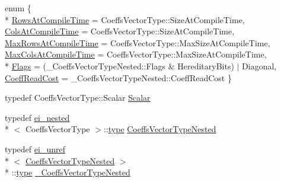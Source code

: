 \begin{DoxyCompactItemize}
\item 
enum \{ \\*
\hyperlink{structei__traits_3_01_diagonal_matrix_3_01_coeffs_vector_type_01_4_01_4_ae9f174ace295beaf78188609837c636ca0978708602c3eeff1333f0ad6fb48370}{Rows\-At\-Compile\-Time} = Coeffs\-Vector\-Type\-:\-:Size\-At\-Compile\-Time, 
\hyperlink{structei__traits_3_01_diagonal_matrix_3_01_coeffs_vector_type_01_4_01_4_ae9f174ace295beaf78188609837c636ca069f0a567bbcadd88436b4a7f5147bc5}{Cols\-At\-Compile\-Time} = Coeffs\-Vector\-Type\-:\-:Size\-At\-Compile\-Time, 
\hyperlink{structei__traits_3_01_diagonal_matrix_3_01_coeffs_vector_type_01_4_01_4_ae9f174ace295beaf78188609837c636ca82233dc1e058c2e8cc66d1f0f3b74b7d}{Max\-Rows\-At\-Compile\-Time} = Coeffs\-Vector\-Type\-:\-:Max\-Size\-At\-Compile\-Time, 
\hyperlink{structei__traits_3_01_diagonal_matrix_3_01_coeffs_vector_type_01_4_01_4_ae9f174ace295beaf78188609837c636cac234007642a00915fd1672309a89765d}{Max\-Cols\-At\-Compile\-Time} = Coeffs\-Vector\-Type\-:\-:Max\-Size\-At\-Compile\-Time, 
\\*
\hyperlink{structei__traits_3_01_diagonal_matrix_3_01_coeffs_vector_type_01_4_01_4_ae9f174ace295beaf78188609837c636cac8d947e6f38ba31ab15a729b8d6ec726}{Flags} = (\-\_\-\-Coeffs\-Vector\-Type\-Nested\-:\-:Flags \& Hereditary\-Bits) $|$ Diagonal, 
\hyperlink{structei__traits_3_01_diagonal_matrix_3_01_coeffs_vector_type_01_4_01_4_ae9f174ace295beaf78188609837c636ca63695fc7c14a8f3360f0189a5b3570bc}{Coeff\-Read\-Cost} = \-\_\-\-Coeffs\-Vector\-Type\-Nested\-:\-:Coeff\-Read\-Cost
 \}
\item 
typedef Coeffs\-Vector\-Type\-::\-Scalar \hyperlink{structei__traits_3_01_diagonal_matrix_3_01_coeffs_vector_type_01_4_01_4_af4a1ab63e1b5020ce4782f748788739b}{Scalar}
\item 
typedef \hyperlink{structei__nested}{ei\-\_\-nested}\\*
$<$ Coeffs\-Vector\-Type $>$\-::\hyperlink{glext_8h_a7d05960f4f1c1b11f3177dc963a45d86}{type} \hyperlink{structei__traits_3_01_diagonal_matrix_3_01_coeffs_vector_type_01_4_01_4_a60ad4adeaeebca8e580ddeadd36b8256}{Coeffs\-Vector\-Type\-Nested}
\item 
typedef \hyperlink{structei__unref}{ei\-\_\-unref}\\*
$<$ \hyperlink{structei__traits_3_01_diagonal_matrix_3_01_coeffs_vector_type_01_4_01_4_a60ad4adeaeebca8e580ddeadd36b8256}{Coeffs\-Vector\-Type\-Nested} $>$\\*
\-::\hyperlink{glext_8h_a7d05960f4f1c1b11f3177dc963a45d86}{type} \hyperlink{structei__traits_3_01_diagonal_matrix_3_01_coeffs_vector_type_01_4_01_4_a97f9eeda885950b593d79b2e071e3658}{\-\_\-\-Coeffs\-Vector\-Type\-Nested}
\end{DoxyCompactItemize}


